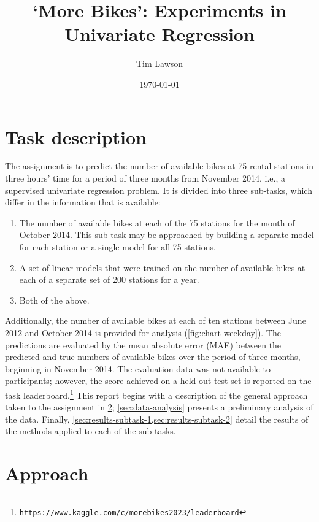 \documentclass[11pt]{extarticle}
\newcommand{\kaggle}{https://www.kaggle.com/c/morebikes2023/leaderboard}
\begin{document}
\title{`More Bikes': Experiments in Univariate Regression}
\author{Tim Lawson}
\date{\today}

\maketitle

\section{Task description}

The assignment is to predict the number of available bikes at 75 rental stations in
three hours' time for a period of three months from November 2014, i.e., a supervised
univariate regression problem.
It is divided into three sub-tasks, which differ in the information that is available:
\begin{enumerate}
  \item The number of available bikes at each of the 75 stations for the month of October 2014.
        This sub-task may be approached by building a separate model for each station or a
        single model for all 75 stations.
  \item A set of linear models that were trained on the number of available bikes at each of a
        separate set of 200 stations for a year.
  \item Both of the above.
\end{enumerate}
Additionally, the number of available bikes at each of ten stations between June 2012
and October 2014 is provided for analysis (\cref{fig:chart-weekday}).
The predictions are evaluated by the mean absolute error (MAE) between the predicted
and true numbers of available bikes over the period of three months, beginning in
November 2014.
The evaluation data was not available to participants; however, the score achieved on a
held-out test set is reported on the task
leaderboard.\footnote{\href{\kaggle}{\texttt{\kaggle}}} This report begins with a
description of the general approach taken to the assignment in \cref{sec:approach};
\cref{sec:data-analysis} presents a preliminary analysis of the data.
Finally, \cref{sec:results-subtask-1,sec:results-subtask-2} detail the results of the
methods applied to each of the sub-tasks.

\section{Approach}
\label{sec:approach}
\end{document}
